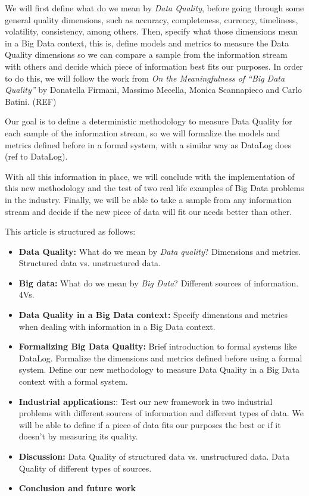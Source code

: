 \documentclass[%
 reprint,
 amsmath,amssymb,
 aps,
]{revtex4-1}
\begin{document}
We will first define what do we mean by \emph{Data Quality}, before going through some general quality dimensions, such as accuracy, completeness, currency, timeliness, volatility, consistency, among others. Then, specify what those dimensions mean in a Big Data context, this is, define models and metrics to measure the  Data Quality dimensions so we can compare a sample from the information stream with others and decide which piece of information best fits our purposes. In order to do this, we will follow the work from \emph{On the Meaningfulness of “Big Data Quality”} by Donatella Firmani, Massimo Mecella, Monica Scannapieco and Carlo Batini. (REF)

Our goal is to define a deterministic methodology to measure Data Quality for each sample of the information stream, so we will formalize the models and metrics defined before in a formal system, with a similar way as DataLog does (ref to DataLog).

With all this information in place, we will conclude with the implementation of this new methodology and the test of two real life examples of Big Data problems in the industry. Finally, we will be able to take a sample from any information stream and decide if the new piece of data will fit our needs better than other.

This article is structured as follows:
\begin{itemize}
  \item \textbf{Data Quality:} What do we mean by \emph{Data quality}? Dimensions and metrics. Structured data vs. unstructured data.
  \item \textbf{Big data:} What do we mean by \emph{Big Data}? Different sources of information. 4Vs.
  \item \textbf{Data Quality in a Big Data context:} Specify dimensions and metrics when dealing with information in a Big Data context.
  \item \textbf{Formalizing Big Data Quality:} Brief introduction to formal systems like DataLog. Formalize the dimensions and metrics defined before using a formal system. Define our new methodology to measure Data Quality in a Big Data context with a formal system.
  \item \textbf{Industrial applications:}: Test our new framework in two industrial problems with different sources of information and different types of data. We will be able to define if a piece of data fits our purposes the best or if it doesn't by measuring its quality.
  \item \textbf{Discussion:} Data Quality of structured data vs. unstructured data. Data Quality of different types of sources.
  \item \textbf{Conclusion and future work}
\end{itemize}
\end{document}

